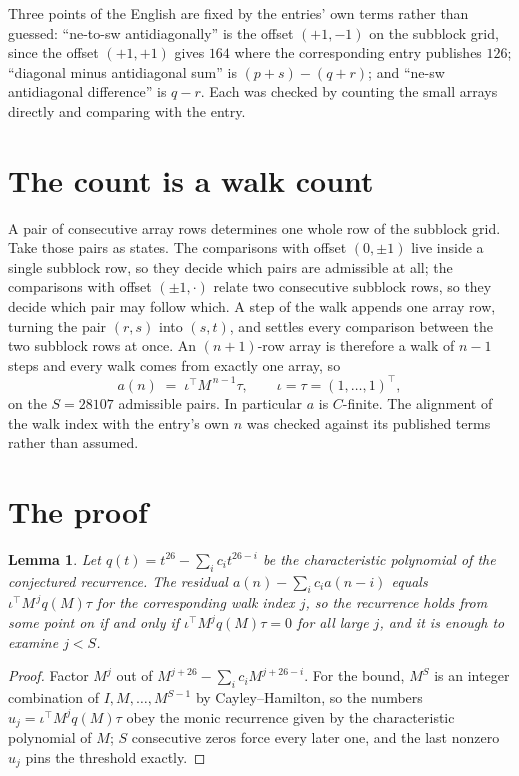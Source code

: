 \documentclass[11pt,a4paper]{article}
\theoremstyle{plain}
\newtheorem{lemma}[theorem]{Lemma}
\theoremstyle{definition}
\begin{document}
Three points of the English are fixed by the entries' own terms rather than guessed:
``ne-to-sw antidiagonally'' is the offset $(+1,-1)$ on the subblock grid, since the offset
$(+1,+1)$ gives $164$ where the corresponding entry publishes $126$; ``diagonal minus
antidiagonal sum'' is $(p+s)-(q+r)$; and ``ne-sw antidiagonal difference'' is $q-r$. Each was
checked by counting the small arrays directly and comparing with the entry.

\section{The count is a walk count}

A pair of consecutive array rows determines one whole row of the subblock grid. Take those
pairs as states. The comparisons with offset $(0,\pm1)$ live inside a single subblock row, so
they decide which pairs are admissible at all; the comparisons with offset $(\pm1,\cdot)$
relate two consecutive subblock rows, so they decide which pair may follow which. A step of the
walk appends one array row, turning the pair $(r,s)$ into $(s,t)$, and settles every comparison
between the two subblock rows at once. An $(n+1)$-row array is therefore a walk of $n-1$ steps
and every walk comes from exactly one array, so
\[
a(n)\;=\;\iota^{\!\top}M^{\,n-1}\tau,\qquad \iota=\tau=(1,\dots,1)^{\!\top},
\]
on the $S=28107$ admissible pairs. In particular $a$ is $C$-finite. The alignment of the walk
index with the entry's own $n$ was checked against its published terms rather than assumed.

\section{The proof}

\begin{lemma}\label{lem:crit}
Let $q(t)=t^{26}-\sum_i c_it^{26-i}$ be the characteristic polynomial of the
conjectured recurrence. The residual $a(n)-\sum_ic_ia(n-i)$ equals
$\iota^{\!\top}M^{\,j}q(M)\tau$ for the corresponding walk index $j$, so the recurrence
holds from some point on if and only if $\iota^{\!\top}M^{j}q(M)\tau=0$ for all large $j$,
and it is enough to examine $j<S$.
\end{lemma}

\begin{proof}
Factor $M^{j}$ out of $M^{j+26}-\sum_ic_iM^{j+26-i}$. For the bound, $M^{S}$
is an integer combination of $I,M,\dots,M^{S-1}$ by Cayley--Hamilton, so the numbers
$u_j=\iota^{\!\top}M^{j}q(M)\tau$ obey the monic recurrence given by the characteristic
polynomial of $M$; $S$ consecutive zeros force every later one, and the last nonzero $u_j$
pins the threshold exactly.
\end{proof}
\end{document}
